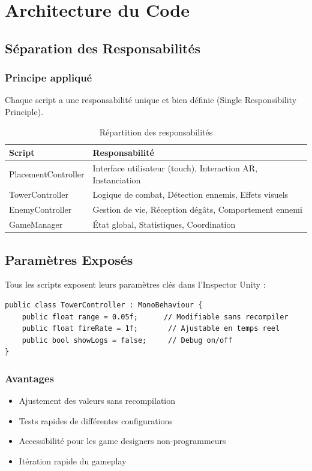 \documentclass[12pt,a4paper]{article}
\begin{document}
\section{Architecture du Code}

\subsection{Séparation des Responsabilités}

\subsubsection{Principe appliqué}
Chaque script a une responsabilité unique et bien définie (Single Responsibility Principle).

\begin{table}[h]
\centering
\begin{tabular}{|l|p{8cm}|}
\hline
\textbf{Script} & \textbf{Responsabilité} \\
\hline
PlacementController & Interface utilisateur (touch), Interaction AR, Instanciation \\
\hline
TowerController & Logique de combat, Détection ennemis, Effets visuels \\
\hline
EnemyController & Gestion de vie, Réception dégâts, Comportement ennemi \\
\hline
GameManager & État global, Statistiques, Coordination \\
\hline
\end{tabular}
\caption{Répartition des responsabilités}
\end{table}

\subsection{Paramètres Exposés}

Tous les scripts exposent leurs paramètres clés dans l'Inspector Unity :

\begin{lstlisting}[caption=Exemple de paramètres publics]
public class TowerController : MonoBehaviour {
    public float range = 0.05f;      // Modifiable sans recompiler
    public float fireRate = 1f;       // Ajustable en temps reel
    public bool showLogs = false;     // Debug on/off
}
\end{lstlisting}

\subsubsection{Avantages}
\begin{itemize}
    \item Ajustement des valeurs sans recompilation
    \item Tests rapides de différentes configurations
    \item Accessibilité pour les game designers non-programmeurs
    \item Itération rapide du gameplay
\end{itemize}
\end{document}

